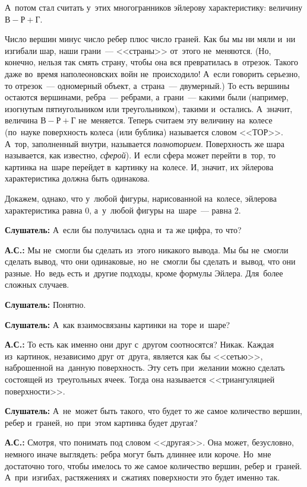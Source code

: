 А~потом стал считать у~этих многогранников эйлерову характеристику: величину $\text{В}-\text{Р}+\text{Г}$.

Число вершин минус число ребер плюс число граней. Как бы мы ни мяли и~ни изгибали шар, наши
грани~--- <<страны>> от~этого не~меняются. (Но, конечно, нельзя так смять страну, чтобы она вся
превратилась в~отрезок. Такого даже во~время наполеоновских войн не~происходило! А~если говорить
серьезно, то отрезок~--- одномерный объект, а~страна~--- двумерный.) То есть вершины остаются
вершинами, ребра~--- ребрами, а~грани~--- какими были (например, изогнутым пятиугольником или
треугольником), такими и~остались.
 А~значит, величина $\text{В}-\text{Р}+\text{Г}$ не~меняется. Теперь считаем эту
величину на~колесе (по~науке поверхность колеса (или бублика) называется словом <<ТОР>>. А~тор,
заполненный внутри, называется \textit{полноторием}. Поверхность же шара называется, как известно,
\textit{сферой}).
 И~если сфера может перейти в~тор, то картинка на~шаре перейдет в~картинку на~колесе. И,
значит, их эйлерова характеристика должна быть одинакова.

Докажем, однако, что у~любой фигуры, нарисованной на~колесе, эйлерова характеристика равна 0,
а~у~любой фигуры на~шаре~--- равна 2.

\textbf{Слушатель:} А~если бы получилась одна и~та же цифра, то что?

\textbf{А.С.:} Мы не~смогли бы сделать из~этого никакого вывода. Мы бы не~смогли сделать вывод, что
они одинаковые, но~не~смогли бы сделать и~вывод, что они разные. Но~ведь есть и~другие подходы,
кроме формулы Эйлера. Для~более сложных случаев.

\textbf{Слушатель:} Понятно.

\textbf{Слушатель:} А~как взаимосвязаны картинки на~торе и~шаре?

\textbf{А.С.:} То есть как именно они друг с~другом соотносятся? Никак. Каждая из~картинок, независимо друг
от~друга, является как бы <<сетью>>, наброшенной на~данную поверхность. Эту сеть при~желании можно
сделать состоящей из~треугольных ячеек. Тогда она называется <<триангуляцией поверхности>>.

\textbf{Слушатель:} А~не~может быть такого, что будет то же самое количество вершин, ребер и~граней,
но~при~этом картинка будет другая?

\textbf{А.С.:} Смотря, что понимать под словом <<другая>>. Она может, безусловно, немного иначе выглядеть:
ребра могут быть длиннее или короче. Но~мне достаточно того, чтобы имелось то же самое количество
вершин, ребер и~граней. А~при~изгибах, растяжениях и~сжатиях поверхности это будет именно так.

